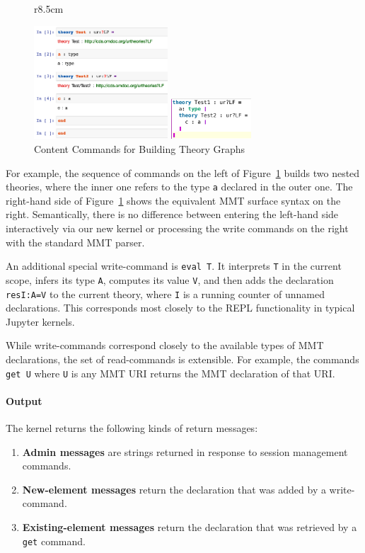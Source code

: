 \begin{figure}r{8.5cm}%
  \begin{minipage}[c]{5cm}\includegraphics[width=5cm]{screenshots/nesting}\end{minipage}\quad
  \begin{minipage}[c]{3cm}\includegraphics[width=3cm]{../D4.11/test_theory}\end{minipage}
  \caption{Content Commands for Building Theory Graphs}\label{fig:test_theory}
  \vspace{-20pt}
\end{figure}

For example, the sequence of commands on the left of Figure~\ref{fig:test_theory} builds two nested theories, where the inner one refers to the type \texttt{a} declared in the outer one.
The right-hand side of Figure~\ref{fig:test_theory} shows the equivalent MMT surface syntax on the right.
Semantically, there is no difference between entering the left-hand side interactively via our new kernel or processing the write commands on the right with the standard MMT parser.

An additional special write-command is \texttt{eval T}.
It interprets \texttt{T} in the current scope, infers its type \texttt{A}, computes its value \texttt{V}, and then adds the declaration \texttt{resI:A=V} to the current theory, where \texttt{I} is a running counter of unnamed declarations.
This corresponds most closely to the REPL functionality in typical Jupyter kernels.

While write-commands correspond closely to the available types of MMT declarations, the set of read-commands is extensible.
For example, the commands \texttt{get U} where \texttt{U} is any MMT URI returns the MMT declaration of that URI.

\paragraph{Output}
The kernel returns the following kinds of return messages:
\begin{enumerate}
\item \textbf{Admin messages} are strings returned in response to session management commands.
\item \textbf{New-element messages} return the declaration that was added by a write-command.
\item \textbf{Existing-element messages} return the declaration that was retrieved by a \texttt{get} command.
\end{enumerate}

